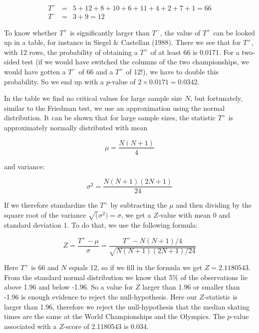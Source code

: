 \documentclass[]{report}\usepackage[]{graphicx}\usepackage[]{color}
\begin{document}
\begin{eqnarray}
T^+ &=& 5+ 12 + 8 +10+6+11+4 +2 +7 +1 = 66 \nonumber \\
T^- &=& 3 + 9= 12 \nonumber
\end{eqnarray}



To know whether $T^+$ is significantly larger than $T^-$, the value of $T^+$ can be looked up in a table, for instance in Siegel \& Castellan (1988). There we see that for $T^+$, with 12 rows, the probability of obtaining a $T^+$ of at least 66 is 0.0171. For a two-sided test (if we would have switched the columns of the two championships, we would have gotten a $T^-$ of 66 and a $T^+$ of 12!), we have to double this probability. So we end up with a $p$-value of $2 \times 0.0171=0.0342$.


In the table we find no critical values for large sample size $N$, but fortunately, similar to the Friedman test, we use an approximation using the normal distribution. It can be shown that for large sample sizes, the statistic $T^+$ is approximately normally distributed with mean


\begin{equation}
\mu = \frac{N(N+1)}{4}
\end{equation}

and variance:

\begin{equation}
\sigma^2= \frac {N(N+1)(2N+1)  }  {24}
\end{equation}


If we therefore standardize the $T^+$ by subtracting the $\mu$ and then dividing by the square root of the variance $\sqrt(\sigma^2)=\sigma$, we get a $Z$-value with mean 0 and standard deviation 1. To do that, we use the following formula:

\begin{equation}
Z = \frac{T^+ - \mu}{\sigma} =  \frac  { T^+ - N(N+1)/4} {\sqrt{N(N+1)(2N+1)/24}}
\end{equation}


Here $T^+$ is 66 and $N$ equals 12, so if we fill in the formula we get $Z= 2.1180543$. From the standard normal distribution we know that 5\% of the observations lie above 1.96 and below -1.96. So a value for $Z$ larger than 1.96 or smaller than -1.96 is enough evidence to reject the null-hypothesis. Here our $Z$-statistic is larger than 1.96, therefore we reject the null-hypothesis that the median skating times are the same at the World Championships and the Olympics. The $p$-value associated with a $Z$-score of 2.1180543 is 0.034.
\end{document}
